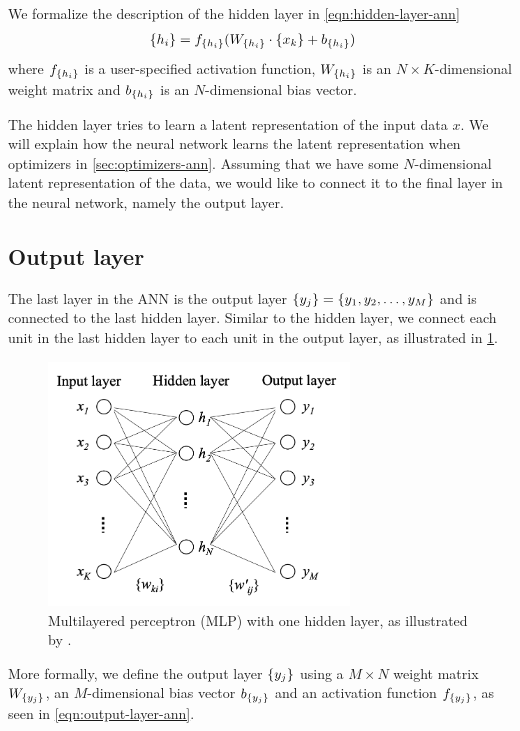 We formalize the description of the hidden layer in \cref{eqn:hidden-layer-ann}
\begin{align}
    \label{eqn:hidden-layer-ann}
    \left\{ {h}_{i} \right\} &= f_{\left\{ {h}_{i} \right\}}(W_{\left\{ {h}_{i} \right\}} \cdot \left\{ {x}_{k} \right\} + b_{\left\{ {h}_{i} \right\}})
\end{align}
where $f_{\left\{ {h}_{i} \right\}}$ is a user-specified activation function, $W_{\left\{ {h}_{i} \right\}}$ is an $N \times K$-dimensional weight matrix and $b_{\left\{ {h}_{i} \right\}}$ is an $N$-dimensional bias vector.

The hidden layer tries to learn a latent representation of the input data $x$. We will explain how the neural network learns the latent representation when optimizers in \cref{sec:optimizers-ann}. Assuming that we have some $N$-dimensional latent representation of the data, we would like to connect it to the final layer in the neural network, namely the output layer.

\subsection{Output layer}
The last layer in the ANN is the output layer $\left\{ {y}_{j} \right\} = \left\{ y_1, y_2, \ldots, y_M \right\}$ and is connected to the last hidden layer. Similar to the hidden layer, we connect each unit in the last hidden layer to each unit in the output layer, as illustrated in \cref{fig:mlp-one-hidden}.

\begin{figure}[H]
    \centering
    \includegraphics[width=8cm]{thesis/figures/multi-layer-neural-network-one-hidden-rong-2014.png}
    \caption{Multilayered perceptron (MLP) with one hidden layer, as illustrated by \cite[Figure 6]{rong2016word2vec}.}
    \label{fig:mlp-one-hidden}
\end{figure}

More formally, we define the output layer $\left\{ {y}_{j} \right\}$ using a $M \times N$ weight matrix $W_{\left\{ {y}_{j} \right\}}$, an $M$-dimensional bias vector $b_{\left\{ {y}_{j} \right\}}$ and an activation function $f_{\left\{ {y}_{j} \right\}}$, as seen in \cref{eqn:output-layer-ann}.

